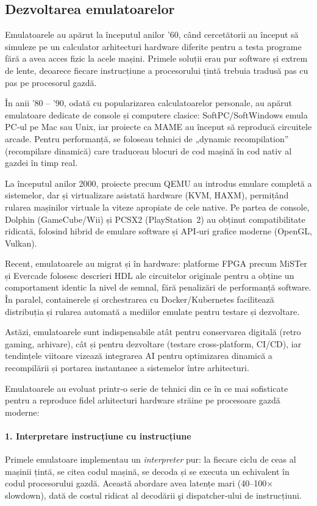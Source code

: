\documentclass[titlepage,12pt]{article}
\begin{document}
\subsection{Dezvoltarea emulatoarelor}

Emulatoarele au apărut la începutul anilor ’60, când cercetătorii au început să simuleze pe un calculator arhitecturi hardware diferite pentru a testa programe fără a avea acces fizic la acele mașini. Primele soluții erau pur software și extrem de lente, deoarece fiecare instrucțiune a procesorului țintă trebuia tradusă pas cu pas pe procesorul gazdă.

În anii ’80 – ’90, odată cu popularizarea calculatoarelor personale, au apărut emulatoare dedicate de console și computere clasice: SoftPC/SoftWindows emula PC‑ul pe Mac sau Unix, iar proiecte ca MAME au început să reproducă circuitele arcade. Pentru performanță, se foloseau tehnici de „dynamic recompilation” (recompilare dinamică) care traduceau blocuri de cod mașină în cod nativ al gazdei în timp real.

La începutul anilor 2000, proiecte precum QEMU au introdus emulare completă a sistemelor, dar și virtualizare asistată hardware (KVM, HAXM), permițând rularea mașinilor virtuale la viteze apropiate de cele native. Pe partea de console, Dolphin (GameCube/Wii) și PCSX2 (PlayStation 2) au obținut compatibilitate ridicată, folosind hibrid de emulare software și API‑uri grafice moderne (OpenGL, Vulkan).

Recent, emulatoarele au migrat și în hardware: platforme FPGA precum MiSTer și Evercade folosesc descrieri HDL ale circuitelor originale pentru a obține un comportament identic la nivel de semnal, fără penalizări de performanță software. În paralel, containerele și orchestrarea cu Docker/Kubernetes facilitează distribuția și rularea automată a mediilor emulate pentru testare și dezvoltare.

Astăzi, emulatoarele sunt indispensabile atât pentru conservarea digitală (retro gaming, arhivare), cât și pentru dezvoltare (testare cross-platform, CI/CD), iar tendințele viitoare vizează integrarea AI pentru optimizarea dinamică a recompilării și portarea instantanee a sistemelor între arhitecturi.

Emulatoarele au evoluat printr‑o serie de tehnici din ce în ce mai sofisticate pentru a reproduce fidel arhitecturi hardware străine pe procesoare gazdă moderne:

\paragraph{1. Interpretare instrucțiune cu instrucțiune}
Primele emulatoare implementau un \emph{interpreter} pur: la fiecare ciclu de ceas al mașinii țintă, se citea codul mașină, se decoda și se executa un echivalent în codul procesorului gazdă. Această abordare avea latențe mari (40–100× slowdown), dată de costul ridicat al decodării şi dispatcher‑ului de instrucțiuni.
\end{document}
